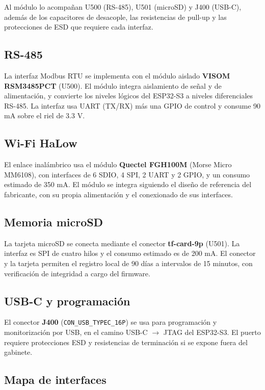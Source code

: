 \documentclass[11pt,a4paper]{article}
\begin{document}
Al módulo lo acompañan U500 (RS-485), U501 (microSD) y J400 (USB-C), además de los
capacitores de desacople, las resistencias de pull-up y las protecciones de ESD
que requiere cada interfaz.

\subsection{RS-485}

La interfaz Modbus RTU se implementa con el módulo aislado
\textbf{VISOM RSM3485PCT} (U500). El módulo integra aislamiento de señal y de
alimentación, y convierte los niveles lógicos del ESP32-S3 a niveles
diferenciales RS-485. La interfaz usa UART (TX/RX) más una GPIO de control y
consume 90 mA sobre el riel de 3.3 V.

\subsection{Wi-Fi HaLow}

El enlace inalámbrico usa el módulo \textbf{Quectel FGH100M} (Morse Micro
MM6108), con interfaces de 6 SDIO, 4 SPI, 2 UART y 2 GPIO, y un consumo
estimado de 350 mA. El módulo se integra siguiendo el diseño de referencia del
fabricante, con su propia alimentación y el conexionado de sus interfaces.

\subsection{Memoria microSD}

La tarjeta microSD se conecta mediante el conector \textbf{tf-card-9p} (U501).
La interfaz es SPI de cuatro hilos y el consumo estimado es de 200 mA. El
conector y la tarjeta permiten el registro local de 90 días a intervalos de
15 minutos, con verificación de integridad a cargo del firmware.

\subsection{USB-C y programación}

El conector \textbf{J400} (\texttt{CON\_USB\_TYPEC\_16P}) se usa para
programación y monitorización por USB, en el camino USB-C $\rightarrow$ JTAG del
ESP32-S3. El puerto requiere protecciones ESD y resistencias de terminación si
se expone fuera del gabinete.

\subsection{Mapa de interfaces}
\end{document}
